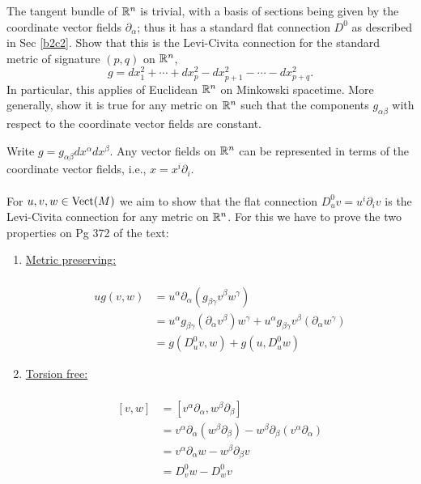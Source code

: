 \documentclass[10pt]{article}
\begin{document}
\begin{example}
	The tangent bundle of $\mathbb{R}^n$ is trivial, with a basis of sections being given by the coordinate vector fields $\partial_\alpha$; thus it has a standard flat connection $D^0$ as described in Sec \ref{b2c2}. Show that this is the Levi-Civita connection for the standard metric of signature $(p,q)$ on $\mathbb{R}^n$,
	$$
	g=dx_1^2+\cdots+dx_p^2-dx_{p+1}^2-\cdots-dx_{p+q}^2.
	$$
	In particular, this applies of Euclidean $\mathbb{R}^n$ on Minkowski spacetime. More generally, show it is true for any metric on $\mathbb{R}^n$ such that the components $g_{\alpha\beta}$ with respect to the coordinate vector fields are constant.
\end{example}
\sol Write $g=g_{\alpha\beta}dx^\alpha dx^\beta$. Any vector fields on $\mathbb{R}^n$ can be represented in terms of the coordinate vector fields, i.e., $x=x^i\partial_i$.\\\\
For $u,v,w \in \text{Vect}(M)$ we aim to show that the flat connection $D_u^0v=u^i\partial_iv$ is the Levi-Civita connection for any metric on $\mathbb{R}^n$. For this we have to prove the two properties on Pg 372 of the text:
\begin{enumerate}
	\item \underline{Metric preserving:}\\\\
	$$
	\begin{aligned}
		ug(v,w) &= u^\alpha\partial_\alpha(g_{\beta\gamma}v^\beta w^\gamma)\\
		&= u^\alpha g_{\beta\gamma}(\partial_\alpha v^\beta) w^\gamma + u^\alpha g_{\beta\gamma}v^\beta(\partial_\alpha w^\gamma)\\
		&= g(D_u^0v,w) + g(u,D_u^0w)
	\end{aligned}
	$$
	\item \underline{Torsion free:}\\\\
	$$
	\begin{aligned}
		[v,w] &= [v^\alpha\partial_\alpha,w^\beta\partial_\beta]\\
		&= v^\alpha\partial_\alpha(w^\beta\partial_\beta) - w^\beta\partial_\beta(v^\alpha\partial_\alpha)\\
		&= v^\alpha\partial_\alpha w - w^\beta\partial_\beta v\\
		&= D_v^0w - D_w^0v
	\end{aligned}
	$$
\end{enumerate}
\end{document}

